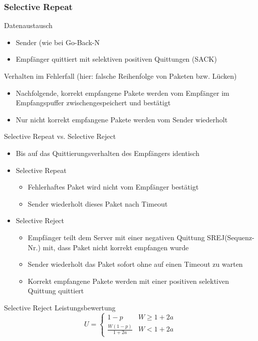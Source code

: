     \subsubsection{Selective Repeat}
      Datenaustausch
      \begin{itemize}
        \item Sender (wie bei Go-Back-N
        \item Empfänger quittiert mit selektiven positiven Quittungen (SACK)
      \end{itemize}
      Verhalten im Fehlerfall (hier: falsche Reihenfolge von Paketen bzw. Lücken)
      \begin{itemize}
        \item Nachfolgende, korrekt empfangene Pakete werden vom Empfänger im Empfangspuffer
          zwischengespeichert und bestätigt
        \item Nur nicht korrekt empfangene Pakete werden vom Sender wiederholt
      \end{itemize}
      Selective Repeat vs. Selective Reject
      \begin{itemize}
        \item Bis auf das Quittierungsverhalten des Empfängers identisch
        \item Selective Repeat
          \begin{itemize}
            \item Fehlerhaftes Paket wird nicht vom Empfänger bestätigt
            \item Sender wiederholt dieses Paket nach Timeout
          \end{itemize}
        \item Selective Reject
          \begin{itemize}
            \item Empfänger teilt dem Server mit einer negativen Quittung SREJ(Sequenz-Nr.) mit, dass
              Paket nicht korrekt empfangen wurde
            \item Sender wiederholt das Paket sofort ohne auf einen Timeout zu warten
            \item Korrekt empfangene Pakete werden mit einer positiven selektiven Quittung quittiert
          \end{itemize}
      \end{itemize}
      Selective Reject Leistungsbewertung
      $$U=\begin{cases}1-p&W\ge1+2a\\\frac{W(1-p)}{1+2a}&W<1+2a\end{cases}$$
